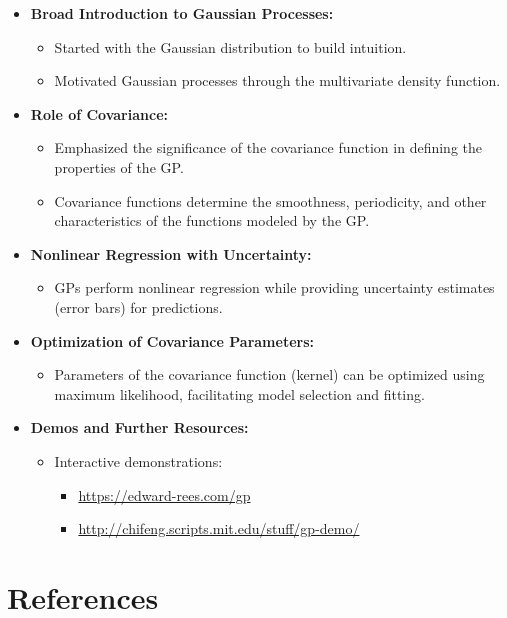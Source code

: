 \documentclass[12pt]{article}
\begin{document}
\begin{itemize}
    \item \textbf{Broad Introduction to Gaussian Processes:}
    \begin{itemize}
        \item Started with the Gaussian distribution to build intuition.
        \item Motivated Gaussian processes through the multivariate density function.
    \end{itemize}
    \item \textbf{Role of Covariance:}
    \begin{itemize}
        \item Emphasized the significance of the covariance function in defining the properties of the GP.
        \item Covariance functions determine the smoothness, periodicity, and other characteristics of the functions modeled by the GP.
    \end{itemize}
    \item \textbf{Nonlinear Regression with Uncertainty:}
    \begin{itemize}
        \item GPs perform nonlinear regression while providing uncertainty estimates (error bars) for predictions.
    \end{itemize}
    \item \textbf{Optimization of Covariance Parameters:}
    \begin{itemize}
        \item Parameters of the covariance function (kernel) can be optimized using maximum likelihood, facilitating model selection and fitting.
    \end{itemize}
    \item \textbf{Demos and Further Resources:}
    \begin{itemize}
        \item Interactive demonstrations:
        \begin{itemize}
            \item \url{https://edward-rees.com/gp}
            \item \url{http://chifeng.scripts.mit.edu/stuff/gp-demo/}
        \end{itemize}
    \end{itemize}
\end{itemize}

\section{References}
\end{document}
